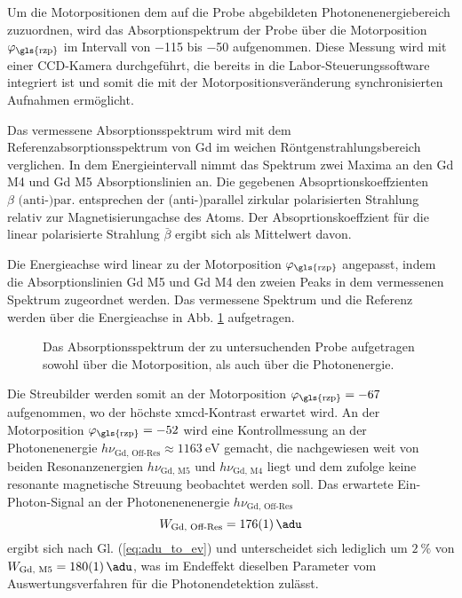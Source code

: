 \noindent
Um die Motorpositionen dem auf die Probe abgebildeten Photonenenergiebereich zuzuordnen, wird das Absorptionspektrum der Probe über die Motorposition $\varphi_\text{\gls{rzp}}$ im Intervall von \num{-115} bis \num{-50} aufgenommen. Diese Messung wird mit einer CCD-Kamera durchgeführt, die bereits in die Labor-Steuerungssoftware integriert ist und somit die mit der Motorpositionsveränderung synchronisierten Aufnahmen ermöglicht.

\noindent
Das vermessene Absorptionsspektrum wird mit dem Referenzabsorptionsspektrum von Gd im weichen Röntgenstrahlungsbereich verglichen. In dem Energieintervall nimmt das Spektrum zwei Maxima an den Gd M4 und Gd M5 Absorptionslinien an. Die gegebenen \cite[Abb. 2]{prieto-x-ray-2005} Absoprtionskoeffzienten $\beta \text{ (anti-)par.}$ entsprechen der (anti-)parallel zirkular polarisierten Strahlung relativ zur Magnetisierungachse des Atoms. Der Absoprtionskoeffzient für die linear polarisierte Strahlung $\bar{\beta}$ ergibt sich als Mittelwert davon.

\noindent
Die Energieachse wird linear zu der Motorposition $\varphi_\text{\gls{rzp}}$ angepasst, indem die Absorptionslinien Gd M5 und Gd M4 den zweien Peaks in dem vermessenen Spektrum zugeordnet werden. Das vermessene Spektrum und die Referenz werden über die Energieachse in Abb. \ref{fig:rzp_phi_ev} aufgetragen.
\begin{figure}[H]
    \centering
    
    \caption{Das Absorptionsspektrum der zu untersuchenden Probe aufgetragen sowohl über die Motorposition, als auch über die Photonenergie.}
    \label{fig:rzp_phi_ev}
\end{figure}
\noindent
Die Streubilder werden somit an der Motorposition $\varphi_\text{\gls{rzp}} = \num{-67}$ aufgenommen, wo der höchste \gls{xmcd}-Kontrast erwartet wird. An der Motorposition $\varphi_\text{\gls{rzp}} = \num{-52}$ wird eine Kontrollmessung an der Photonenenergie $h\nu_\text{Gd, Off-Res} \approx \SI{1163}{\eV}$ gemacht, die nachgewiesen weit von beiden Resonanzenergien $h\nu_\text{Gd, M5}$ und $h\nu_\text{Gd, M4}$ liegt und dem zufolge keine resonante magnetische Streuung beobachtet werden soll. Das erwartete Ein-Photon-Signal an der Photonenenenergie $h\nu_\text{Gd, Off-Res}$ 
\begin{equation}
    W_\text{Gd, Off-Res} = \SI{176(1)}{\adu}
\end{equation}
ergibt sich nach Gl. (\ref{eq:adu_to_ev}) und unterscheidet sich lediglich um $\SI{2}{\percent}$ von $W_\text{Gd, M5} = \SI{180(1)}{\adu}$, was im Endeffekt dieselben Parameter vom Auswertungsverfahren für die Photonendetektion zulässt.

